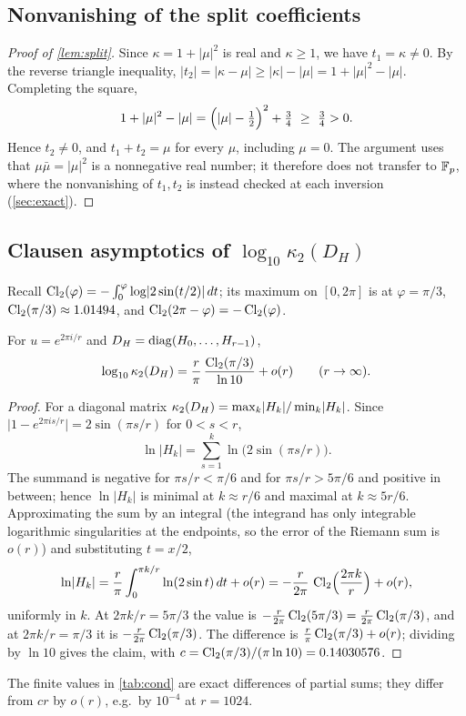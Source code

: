 \documentclass[11pt]{article}
\theoremstyle{plain}
\DeclareMathOperator{\diag}{diag}
\newcommand{\abs}[1]{\lvert #1\rvert}
\begin{document}
\subsection{Nonvanishing of the split coefficients}\label{app:kappa}
\begin{proof}[Proof of \cref{lem:split}]
Since $\kappa=1+\abs{\mu}^2$ is real and $\kappa\ge1$, we have $t_1=\kappa\ne0$. By the reverse triangle inequality, $\abs{t_2}=\abs{\kappa-\mu}\ge\abs{\kappa}-\abs{\mu}=1+\abs{\mu}^2-\abs{\mu}$. Completing the square,
\[
1+\abs{\mu}^2-\abs{\mu}=\Bigl(\abs{\mu}-\tfrac12\Bigr)^2+\tfrac34\ \ge\ \tfrac34>0 .
\]
Hence $t_2\ne0$, and $t_1+t_2=\mu$ for every $\mu$, including $\mu=0$. The argument uses that $\mu\bar\mu=\abs{\mu}^2$ is a nonnegative real number; it therefore does not transfer to $\mathbb{F}_p$, where the nonvanishing of $t_1,t_2$ is instead checked at each inversion (\cref{sec:exact}).
\end{proof}

\subsection{Clausen asymptotics of \texorpdfstring{$\log_{10}\kappa_2(D_H)$}{log10 kappa2(DH)}}\label{app:clausen}
Recall $\Cl(\varphi)=-\int_0^{\varphi}\log\abs{2\sin(t/2)}\,dt$; its maximum on $[0,2\pi]$ is at $\varphi=\pi/3$, $\operatorname{Cl}_2(\pi/3)\approx1.01494$, and $\operatorname{Cl}_2(2\pi-\varphi)=-\operatorname{Cl}_2(\varphi)$.
\begin{proposition}\label{prop:clausen}
For $u=e^{2\pi i/r}$ and $\Dh=\diag(H_0,\dots,H_{r-1})$,
\[
\log_{10}\kappa_2(D_H)=\frac{r}{\pi}\,\frac{\operatorname{Cl}_2(\pi/3)}{\ln10}+o(r)\qquad(r\to\infty).
\]
\end{proposition}
\begin{proof}
For a diagonal matrix $\kappa_2(\Dh)=\max_k\abs{H_k}/\min_k\abs{H_k}$. Since $\abs{1-e^{2\pi is/r}}=2\sin(\pi s/r)$ for $0<s<r$,
\[
\ln\abs{H_k}=\sum_{s=1}^{k}\ln\bigl(2\sin(\pi s/r)\bigr).
\]
The summand is negative for $\pi s/r<\pi/6$ and for $\pi s/r>5\pi/6$ and positive in between; hence $\ln\abs{H_k}$ is minimal at $k\approx r/6$ and maximal at $k\approx5r/6$. Approximating the sum by an integral (the integrand has only integrable logarithmic singularities at the endpoints, so the error of the Riemann sum is $o(r)$) and substituting $t=x/2$,
\[
\ln\abs{H_k}=\frac{r}{\pi}\int_0^{\pi k/r}\ln(2\sin t)\,dt+o(r)=-\frac{r}{2\pi}\,\Cl\Bigl(\frac{2\pi k}{r}\Bigr)+o(r),
\]
uniformly in $k$. At $2\pi k/r=5\pi/3$ the value is $-\frac{r}{2\pi}\operatorname{Cl}_2(5\pi/3)=\frac{r}{2\pi}\operatorname{Cl}_2(\pi/3)$, and at $2\pi k/r=\pi/3$ it is $-\frac{r}{2\pi}\operatorname{Cl}_2(\pi/3)$. The difference is $\frac{r}{\pi}\operatorname{Cl}_2(\pi/3)+o(r)$; dividing by $\ln10$ gives the claim, with $c=\operatorname{Cl}_2(\pi/3)/(\pi\ln10)=0.14030576$.
\end{proof}
The finite values in \cref{tab:cond} are exact differences of partial sums; they differ from $cr$ by $o(r)$, e.g.\ by $10^{-4}$ at $r=1024$.
\end{document}
